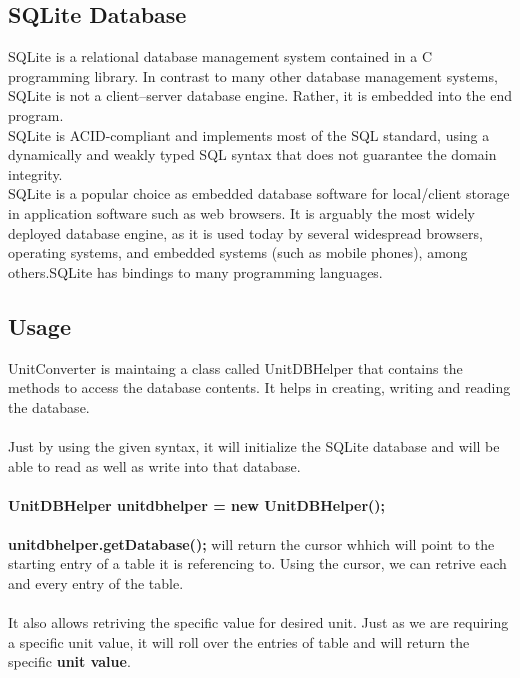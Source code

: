 \documentclass[a4paper, 12pt]{report}
\begin{document}
\subsection{SQLite Database}
\hspace{0.8cm}SQLite is a relational database management system contained in a C programming library. In contrast to many other database management systems, SQLite is not a client–server database engine. Rather, it is embedded into the end program.
\\\hspace*{0.8cm}
SQLite is ACID-compliant and implements most of the SQL standard, using a dynamically and weakly typed SQL syntax that does not guarantee the domain integrity.
\\\hspace*{0.8cm}
SQLite is a popular choice as embedded database software for local/client storage in application software such as web browsers. It is arguably the most widely deployed database engine, as it is used today by several widespread browsers, operating systems, and embedded systems (such as mobile phones), among others.SQLite has bindings to many programming languages.
\subsection{Usage}
\hspace{0.8cm}UnitConverter is maintaing a class called UnitDBHelper that contains the methods to access the database contents. It helps in creating, writing and reading the database.\\\\
\hspace*{0.8cm}Just by using the given syntax, it will initialize the SQLite database and will be able to read as well as write into that database.\\
\\\hspace*{1.5cm}\textbf{UnitDBHelper unitdbhelper = new UnitDBHelper();}\\\\
\hspace*{0.8cm}\textbf{unitdbhelper.getDatabase();} will return the cursor whhich will point to the starting entry of a table it is referencing to. Using the cursor, we can retrive each and every entry of the table.\\
\\\hspace*{0.8cm} It also allows retriving the specific value for desired unit. Just as we are requiring a specific unit value, it will roll over the entries of table and will return the specific \textbf{unit value}.
\end{document}
